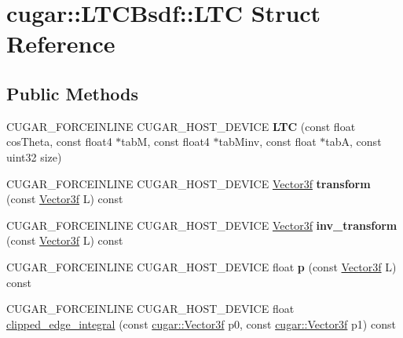 \hypertarget{structcugar_1_1_l_t_c_bsdf_1_1_l_t_c}{}\section{cugar\+:\+:L\+T\+C\+Bsdf\+:\+:L\+TC Struct Reference}
\label{structcugar_1_1_l_t_c_bsdf_1_1_l_t_c}
\subsection*{Public Methods}
\begin{DoxyCompactItemize}
\item 
\mbox{\label{structcugar_1_1_l_t_c_bsdf_1_1_l_t_c_af5e64a85f8d018d874cf7159f13e5379}} 
C\+U\+G\+A\+R\+\_\+\+F\+O\+R\+C\+E\+I\+N\+L\+I\+NE C\+U\+G\+A\+R\+\_\+\+H\+O\+S\+T\+\_\+\+D\+E\+V\+I\+CE {\bfseries L\+TC} (const float cos\+Theta, const float4 $\ast$tabM, const float4 $\ast$tab\+Minv, const float $\ast$tabA, const uint32 size)
\item 
\mbox{\label{structcugar_1_1_l_t_c_bsdf_1_1_l_t_c_ac86a634c0adad0af7b14ce32f48772f1}} 
C\+U\+G\+A\+R\+\_\+\+F\+O\+R\+C\+E\+I\+N\+L\+I\+NE C\+U\+G\+A\+R\+\_\+\+H\+O\+S\+T\+\_\+\+D\+E\+V\+I\+CE \hyperlink{structcugar_1_1_vector}{Vector3f} {\bfseries transform} (const \hyperlink{structcugar_1_1_vector}{Vector3f} L) const
\item 
\mbox{\label{structcugar_1_1_l_t_c_bsdf_1_1_l_t_c_abdcefe5ea05dcac2cfc6f9d01ce1ef08}} 
C\+U\+G\+A\+R\+\_\+\+F\+O\+R\+C\+E\+I\+N\+L\+I\+NE C\+U\+G\+A\+R\+\_\+\+H\+O\+S\+T\+\_\+\+D\+E\+V\+I\+CE \hyperlink{structcugar_1_1_vector}{Vector3f} {\bfseries inv\+\_\+transform} (const \hyperlink{structcugar_1_1_vector}{Vector3f} L) const
\item 
\mbox{\label{structcugar_1_1_l_t_c_bsdf_1_1_l_t_c_a6cd56a0c25f6e42346cfa03f95cf726b}} 
C\+U\+G\+A\+R\+\_\+\+F\+O\+R\+C\+E\+I\+N\+L\+I\+NE C\+U\+G\+A\+R\+\_\+\+H\+O\+S\+T\+\_\+\+D\+E\+V\+I\+CE float {\bfseries p} (const \hyperlink{structcugar_1_1_vector}{Vector3f} L) const
\item 
C\+U\+G\+A\+R\+\_\+\+F\+O\+R\+C\+E\+I\+N\+L\+I\+NE C\+U\+G\+A\+R\+\_\+\+H\+O\+S\+T\+\_\+\+D\+E\+V\+I\+CE float \hyperlink{structcugar_1_1_l_t_c_bsdf_1_1_l_t_c_aa7d8ebf1030edf67ea3fb293a536e63a}{clipped\+\_\+edge\+\_\+integral} (const \hyperlink{structcugar_1_1_vector}{cugar\+::\+Vector3f} p0, const \hyperlink{structcugar_1_1_vector}{cugar\+::\+Vector3f} p1) const

\end{DoxyCompactItemize}
